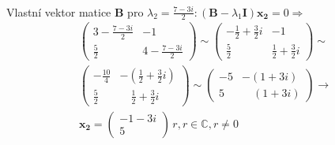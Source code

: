 \begin{example}
\begin{align*}
  \end{align*}
  Vlastní vektor matice $\mathbf{B}$ pro $\lambda_2=\frac{7-3i}{2}:
  (\mathbf{B}-\lambda_1\mathbf{I})\mathbf{x_2}=0 \Rightarrow$
  \begin{align*}
    \left(\begin{array}{cc}
             3  - \frac{7-3i}{2}       &  -1                                     \\
            \frac{5}{2}                &  4 - \frac{7-3i}{2}
          \end{array}
    \right)\sim
    \left(\begin{array}{cc}
            -\frac{1}{2}+\frac{3}{2}i  &  -1                                     \\
            \frac{5}{2}                & \frac{1}{2}+\frac{3}{2}i
          \end{array}
    \right)\sim \\
    \left(\begin{array}{cc}
            -\frac{10}{4}              &-\left(\frac{1}{2} +\frac{3}{2}i\right)  \\
            \frac{5}{2}                & \quad\frac{1}{2}+\frac{3}{2}i
          \end{array}
    \right)\sim
      \left(\begin{array}{cc}
            -5                         &-\left(1+3i\right)                       \\
             5                         & \quad\left(1+3i\right)
          \end{array}
    \right)\rightarrow\\
    \mathbf{x_2}=
      \left(
        \begin{array}{c}
          -1-3i \\ 5
        \end{array}
      \right)\, r, r\in\mathbb{C}, r\neq0
  \end{align*}
\end{example}

\begin{lstlisting}[caption=Výpis programu pro ověření výpočtu vlastních čísel matic programem
  Matlab.]
\end{lstlisting}
